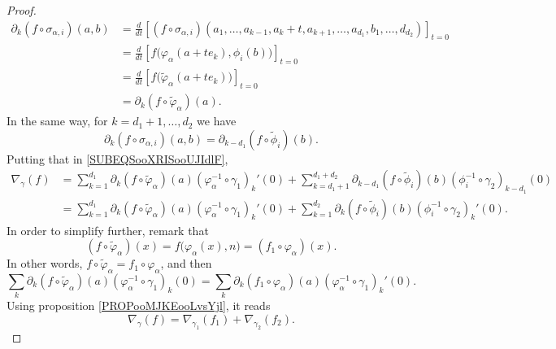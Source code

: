\begin{proof}
	\begin{subequations}
		\begin{align}
			\partial_k(f\circ\sigma_{\alpha,i})(a,b) & =\frac{d}{dt} \left[ (f\circ\sigma_{\alpha,i})(a_1,\ldots,a_{k-1},a_k+t,a_{k+1},\ldots,a_{d_1}, b_1,\ldots,d_{d_2})  \right]_{t=0} \\
			                                         & =\frac{d}{dt} \left[ f\big( \varphi_{\alpha}(a+te_k),\phi_i(b) \big)  \right]_{t=0}                                                \\
			                                         & =\frac{d}{dt} \left[ f\big( \tilde \varphi_{\alpha}(a+te_k) \big)  \right]_{t=0}                                                   \\
			                                         & =\partial_k(f\circ \tilde \varphi_{\alpha})(a).
		\end{align}
	\end{subequations}
	In the same way, for \( k=d_1+1,\ldots,d_2\) we have
	\begin{equation}
		\partial_k(f\circ\sigma_{\alpha,i})(a,b)=\partial_{k-d_1}(f\circ\tilde \phi_i)(b).
	\end{equation}
	Putting that in \eqref{SUBEQSooXRISooUJIdlF},
	\begin{subequations}
		\begin{align}
			\nabla_{\gamma}(f) & =\sum_{k=1}^{d_1}\partial_k(f\circ\tilde \varphi_{\alpha})(a)(\varphi_{\alpha}^{-1}\circ\gamma_1)_k'(0)+\sum_{k=d_1+1}^{d_1+d_2}\partial_{k-d_1}(f\circ\tilde \phi_i)(b)(\phi_i^{-1}\circ\gamma_2)_{k-d_1}(0) \\
			                   & =\sum_{k=1}^{d_1}\partial_k(f\circ\tilde \varphi_{\alpha})(a)(\varphi_{\alpha}^{-1}\circ\gamma_1)_k'(0)+\sum_{k=1}^{d_2}\partial_k(f\circ\tilde \phi_i)(b)(\phi_i^{-1}\circ\gamma_2)_k'(0).
		\end{align}
	\end{subequations}
	In order to simplify further, remark that
	\begin{equation}
		(f\circ\tilde \varphi_{\alpha})(x)=f\big( \varphi_{\alpha}(x),n \big)=(f_1\circ\varphi_{\alpha})(x).
	\end{equation}
	In other words, \( f\circ\tilde \varphi_{\alpha}=f_1\circ\varphi_{\alpha}\), and then
	\begin{equation}
		\sum_k\partial_k(f\circ\tilde \varphi_{\alpha})(a)(\varphi_{\alpha}^{-1}\circ\gamma_1)_k(0)=
		\sum_k\partial_k(f_1\circ\varphi_{\alpha})(a)(\varphi_{\alpha}^{-1}\circ\gamma_1)_k'(0).
	\end{equation}
	Using proposition \ref{PROPooMJKEooLvsYjl}, it reads
	\begin{equation}
		\nabla_{\gamma}(f)=\nabla_{\gamma_1}(f_1)+\nabla_{\gamma_2}(f_2).
	\end{equation}
\end{proof}


